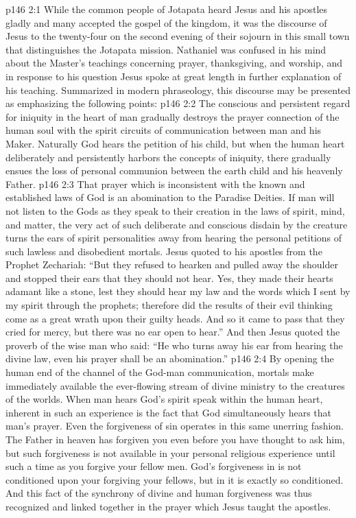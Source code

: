 \vs p146 2:1 While the common people of Jotapata heard Jesus and his apostles gladly and many accepted the gospel of the kingdom, it was the discourse of Jesus to the twenty\hyp{}four on the second evening of their sojourn in this small town that distinguishes the Jotapata mission. Nathaniel was confused in his mind about the Master’s teachings concerning prayer, thanksgiving, and worship, and in response to his question Jesus spoke at great length in further explanation of his teaching. Summarized in modern phraseology, this discourse may be presented as emphasizing the following points:
\vs p146 2:2 \pc {}\bibnobreakspace The conscious and persistent regard for iniquity in the heart of man gradually destroys the prayer connection of the human soul with the spirit circuits of communication between man and his Maker. Naturally God hears the petition of his child, but when the human heart deliberately and persistently harbors the concepts of iniquity, there gradually ensues the loss of personal communion between the earth child and his heavenly Father.
\vs p146 2:3 \pc {}\bibnobreakspace That prayer which is inconsistent with the known and established laws of God is an abomination to the Paradise Deities. If man will not listen to the Gods as they speak to their creation in the laws of spirit, mind, and matter, the very act of such deliberate and conscious disdain by the creature turns the ears of spirit personalities away from hearing the personal petitions of such lawless and disobedient mortals. Jesus quoted to his apostles from the Prophet Zechariah: “But they refused to hearken and pulled away the shoulder and stopped their ears that they should not hear. Yes, they made their hearts adamant like a stone, lest they should hear my law and the words which I sent by my spirit through the prophets; therefore did the results of their evil thinking come as a great wrath upon their guilty heads. And so it came to pass that they cried for mercy, but there was no ear open to hear.” And then Jesus quoted the proverb of the wise man who said: “He who turns away his ear from hearing the divine law, even his prayer shall be an abomination.”
\vs p146 2:4 \pc {}\bibnobreakspace By opening the human end of the channel of the God\hyp{}man communication, mortals make immediately available the ever\hyp{}flowing stream of divine ministry to the creatures of the worlds. When man hears God’s spirit speak within the human heart, inherent in such an experience is the fact that God simultaneously hears that man’s prayer. Even the forgiveness of sin operates in this same unerring fashion. The Father in heaven has forgiven you even before you have thought to ask him, but such forgiveness is not available in your personal religious experience until such a time as you forgive your fellow men. God’s forgiveness in  is not conditioned upon your forgiving your fellows, but in  it is exactly so conditioned. And this fact of the synchrony of divine and human forgiveness was thus recognized and linked together in the prayer which Jesus taught the apostles.
